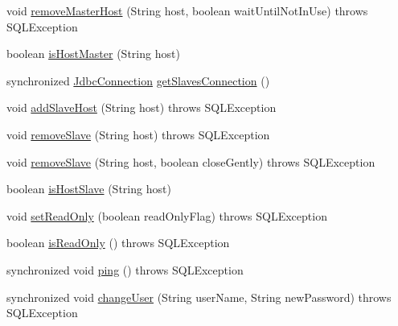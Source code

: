 \begin{DoxyCompactItemize}
void \mbox{\hyperlink{classcom_1_1mysql_1_1cj_1_1jdbc_1_1ha_1_1_replication_my_s_q_l_connection_a58345cde3a7a64f9da4d13bcdba715f1}{remove\+Master\+Host}} (String host, boolean wait\+Until\+Not\+In\+Use)  throws S\+Q\+L\+Exception 
\item 
boolean \mbox{\hyperlink{classcom_1_1mysql_1_1cj_1_1jdbc_1_1ha_1_1_replication_my_s_q_l_connection_af096f43b025284f2679e1965fd4fd230}{is\+Host\+Master}} (String host)
\item 
synchronized \mbox{\hyperlink{interfacecom_1_1mysql_1_1cj_1_1jdbc_1_1_jdbc_connection}{Jdbc\+Connection}} \mbox{\hyperlink{classcom_1_1mysql_1_1cj_1_1jdbc_1_1ha_1_1_replication_my_s_q_l_connection_a088e6456dc0dd8f90f7ded1aed7a6324}{get\+Slaves\+Connection}} ()
\item 
void \mbox{\hyperlink{classcom_1_1mysql_1_1cj_1_1jdbc_1_1ha_1_1_replication_my_s_q_l_connection_a6c18dfc535a6c1997117a897224af213}{add\+Slave\+Host}} (String host)  throws S\+Q\+L\+Exception 
\item 
void \mbox{\hyperlink{classcom_1_1mysql_1_1cj_1_1jdbc_1_1ha_1_1_replication_my_s_q_l_connection_a2de6631ba38ed04c74adf82445618d17}{remove\+Slave}} (String host)  throws S\+Q\+L\+Exception 
\item 
void \mbox{\hyperlink{classcom_1_1mysql_1_1cj_1_1jdbc_1_1ha_1_1_replication_my_s_q_l_connection_a8552a17ffb5ad710e46bae3f5aad53f7}{remove\+Slave}} (String host, boolean close\+Gently)  throws S\+Q\+L\+Exception 
\item 
boolean \mbox{\hyperlink{classcom_1_1mysql_1_1cj_1_1jdbc_1_1ha_1_1_replication_my_s_q_l_connection_a55c6af349813e6a4b4527207647beadb}{is\+Host\+Slave}} (String host)
\item 
void \mbox{\hyperlink{classcom_1_1mysql_1_1cj_1_1jdbc_1_1ha_1_1_replication_my_s_q_l_connection_af5970929ca56566eb6191de86461468e}{set\+Read\+Only}} (boolean read\+Only\+Flag)  throws S\+Q\+L\+Exception 
\item 
boolean \mbox{\hyperlink{classcom_1_1mysql_1_1cj_1_1jdbc_1_1ha_1_1_replication_my_s_q_l_connection_acd2b666738b70f41d415e2e3a4e0ec6f}{is\+Read\+Only}} ()  throws S\+Q\+L\+Exception 
\item 
synchronized void \mbox{\hyperlink{classcom_1_1mysql_1_1cj_1_1jdbc_1_1ha_1_1_replication_my_s_q_l_connection_a87a413280dac1e1f0be1bd8c93420082}{ping}} ()  throws S\+Q\+L\+Exception 
\item 
synchronized void \mbox{\hyperlink{classcom_1_1mysql_1_1cj_1_1jdbc_1_1ha_1_1_replication_my_s_q_l_connection_a42cf4364f5721814b388fa7bef9fb009}{change\+User}} (String user\+Name, String new\+Password)  throws S\+Q\+L\+Exception 

\end{DoxyCompactItemize}
